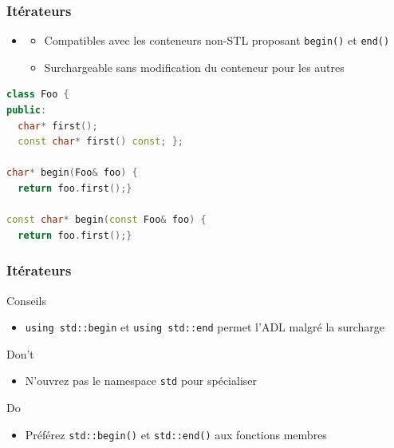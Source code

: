 \documentclass[C++.tex]{subfiles}
\begin{document}
\begin{frame}[fragile]
	\frametitle{Itérateurs}
	\begin{itemize}
		\item [] \begin{itemize}
			\item Compatibles avec les conteneurs non-STL proposant \lstinline|begin()| et \lstinline|end()|
			\item Surchargeable sans modification du conteneur pour les autres

		\end{itemize}
	\end{itemize}

	\begin{lstlisting}[language=C++]
class Foo {
public:
  char* first();
  const char* first() const; };

char* begin(Foo& foo) {
  return foo.first();}

const char* begin(const Foo& foo) {
  return foo.first();}\end{lstlisting}
\end{frame}

\begin{frame}[fragile]
	\frametitle{Itérateurs}
	\begin{block}{Conseils}
		\begin{itemize}
			\item \lstinline|using std::begin| et \lstinline|using std::end| permet l'ADL malgré la surcharge
		\end{itemize}
	\end{block}

	\begin{alertblock}{Don't}
		\begin{itemize}
			\item N'ouvrez pas le namespace \lstinline|std| pour spécialiser
		\end{itemize}
	\end{alertblock}

	\begin{exampleblock}{Do}
		\begin{itemize}
			\item Préférez \lstinline|std::begin()| et \lstinline|std::end()| aux fonctions membres
		\end{itemize}

	\end{exampleblock}
\end{frame}
\end{document}
